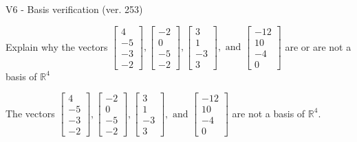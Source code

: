 \begin{exercise}
  \begin{exerciseTitle}V6 - Basis verification (ver. 253)\end{exerciseTitle}
  \begin{exerciseStatement}
    Explain why the vectors \(\left[\begin{array}{r}
4 \\
-5 \\
-3 \\
-2
\end{array}\right] , \left[\begin{array}{r}
-2 \\
0 \\
-5 \\
-2
\end{array}\right] , \left[\begin{array}{r}
3 \\
1 \\
-3 \\
3
\end{array}\right] , \text{ and } \left[\begin{array}{r}
-12 \\
10 \\
-4 \\
0
\end{array}\right]\) are or are not a basis of \(\mathbb{R}^4\)	


  \end{exerciseStatement}
  \begin{exerciseAnswer}
   The vectors \(\left[\begin{array}{r}
4 \\
-5 \\
-3 \\
-2
\end{array}\right] , \left[\begin{array}{r}
-2 \\
0 \\
-5 \\
-2
\end{array}\right] , \left[\begin{array}{r}
3 \\
1 \\
-3 \\
3
\end{array}\right] , \text{ and } \left[\begin{array}{r}
-12 \\
10 \\
-4 \\
0
\end{array}\right]\) 
  	 are not  a basis of \(\mathbb{R}^4\).
  


  \end{exerciseAnswer}
\end{exercise}